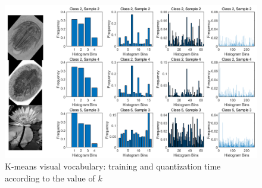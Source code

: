  \begin{figure}
 	\centering
 	\includegraphics[width=0.4\linewidth]{image/q1-fig2.png}
 	\caption{K-means visual vocabulary: training and quantization time according to the value of $k$}
 	\label{fig:q1-fig2}
 \end{figure}
 